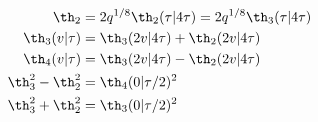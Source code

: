 \begin{equation}
  \begin{split}
    \th_2 &= 2 q^{1/8}  \th_2(\tau|4\tau) = 2 q^{1/8}\th_3(\tau|4\tau)\\
    \th_3(v|\tau) &= \th_3(2v|4\tau) + \th_2(2v|4\tau) \\
    \th_4(v|\tau) &= \th_3(2v|4\tau) - \th_2(2v|4\tau)\\
    \th_3^2-\th_2^2 &= \th_4(0|\tau/2)^2 \\
    \th_3^2+\th_2^2 &= \th_3(0|\tau/2)^2 \\
  \end{split}
\end{equation}

